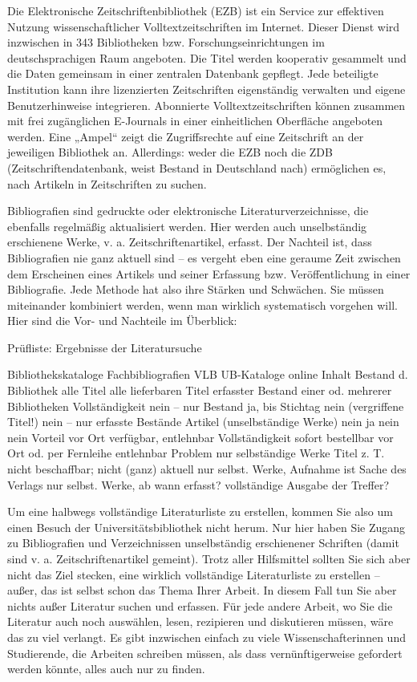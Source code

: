 \documentclass[]{book}
\theoremstyle{definition}
\theoremstyle{definition}
\theoremstyle{definition}
\theoremstyle{remark}
\begin{document}
Die Elektronische Zeitschriftenbibliothek (EZB) ist ein Service zur
effektiven Nutzung wissenschaftlicher Volltextzeitschriften im Internet.
Dieser Dienst wird inzwischen in 343 Bibliotheken bzw.
Forschungseinrichtungen im deutschsprachigen Raum angeboten. Die Titel
werden kooperativ gesammelt und die Daten gemeinsam in einer zentralen
Datenbank gepflegt. Jede beteiligte Institution kann ihre lizenzierten
Zeitschriften eigenständig verwalten und eigene Benutzerhinweise
integrieren. Abonnierte Volltextzeitschriften können zusammen mit frei
zugänglichen E-Journals in einer einheitlichen Oberfläche angeboten
werden. Eine „Ampel`` zeigt die Zugriffsrechte auf eine Zeitschrift an
der jeweiligen Bibliothek an. Allerdings: weder die EZB noch die ZDB
(Zeitschriftendatenbank, weist Bestand in Deutschland nach) ermöglichen
es, nach Artikeln in Zeitschriften zu suchen.

Bibliografien sind gedruckte oder elektronische Literaturverzeichnisse,
die ebenfalls regelmäßig aktualisiert werden. Hier werden auch
unselbständig erschienene Werke, v. a. Zeitschriftenartikel, erfasst.
Der Nachteil ist, dass Bibliografien nie ganz aktuell sind -- es vergeht
eben eine geraume Zeit zwischen dem Erscheinen eines Artikels und seiner
Erfassung bzw. Veröffentlichung in einer Bibliografie. Jede Methode hat
also ihre Stärken und Schwächen. Sie müssen miteinander kombiniert
werden, wenn man wirklich systematisch vorgehen will. Hier sind die Vor-
und Nachteile im Überblick:

Prüfliste: Ergebnisse der Literatursuche

Bibliothekskataloge Fachbibliografien VLB UB-Kataloge online Inhalt
Bestand d. Bibliothek alle Titel alle lieferbaren Titel erfasster
Bestand einer od. mehrerer Bibliotheken Vollständigkeit nein -- nur
Bestand ja, bis Stichtag nein (vergriffene Titel!) nein -- nur erfasste
Bestände Artikel (unselbständige Werke) nein ja nein nein Vorteil vor
Ort verfügbar, entlehnbar Vollständigkeit sofort bestellbar vor Ort od.
per Fernleihe entlehnbar Problem nur selbständige Werke Titel z. T.
nicht beschaffbar; nicht (ganz) aktuell nur selbst. Werke, Aufnahme ist
Sache des Verlags nur selbst. Werke, ab wann erfasst? vollständige
Ausgabe der Treffer?

Um eine halbwegs vollständige Literaturliste zu erstellen, kommen Sie
also um einen Besuch der Universitätsbibliothek nicht herum. Nur hier
haben Sie Zugang zu Bibliografien und Verzeichnissen unselbständig
erschienener Schriften (damit sind v. a. Zeitschriftenartikel gemeint).
Trotz aller Hilfsmittel sollten Sie sich aber nicht das Ziel stecken,
eine wirklich vollständige Literaturliste zu erstellen -- außer, das ist
selbst schon das Thema Ihrer Arbeit. In diesem Fall tun Sie aber nichts
außer Literatur suchen und erfassen. Für jede andere Arbeit, wo Sie die
Literatur auch noch auswählen, lesen, rezipieren und diskutieren müssen,
wäre das zu viel verlangt. Es gibt inzwischen einfach zu viele
Wissenschafterinnen und Studierende, die Arbeiten schreiben müssen, als
dass vernünftigerweise gefordert werden könnte, alles auch nur zu
finden.
\end{document}
